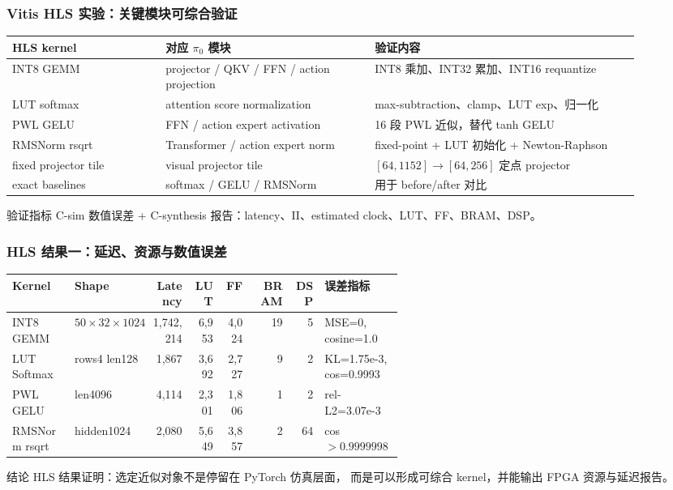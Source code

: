 \documentclass[10pt, aspectratio=169]{beamer}
\begin{document}
\begin{frame}
  \frametitle{Vitis HLS 实验：关键模块可综合验证}
  \small
  \begin{table}
    \scriptsize
    \setlength{\tabcolsep}{2pt}
    \begin{tabular}{@{}p{0.22\linewidth}p{0.30\linewidth}p{0.38\linewidth}@{}}
      \toprule
      HLS kernel & 对应 $\pi_0$ 模块 & 验证内容 \\
      \midrule
      INT8 GEMM & projector / QKV / FFN / action projection & INT8 乘加、INT32 累加、INT16 requantize \\
      LUT softmax & attention score normalization & max-subtraction、clamp、LUT exp、归一化 \\
      PWL GELU & FFN / action expert activation & 16 段 PWL 近似，替代 tanh GELU \\
      RMSNorm rsqrt & Transformer / action expert norm & fixed-point + LUT 初始化 + Newton-Raphson \\
      fixed projector tile & visual projector tile & $[64,1152]\rightarrow[64,256]$ 定点 projector \\
      exact baselines & softmax / GELU / RMSNorm & 用于 before/after 对比 \\
      \bottomrule
    \end{tabular}
  \end{table}

  \begin{exampleblock}{验证指标}
    C-sim 数值误差 + C-synthesis 报告：latency、II、estimated clock、LUT、FF、BRAM、DSP。
  \end{exampleblock}
\end{frame}

\begin{frame}
  \frametitle{HLS 结果一：延迟、资源与数值误差}
  \scriptsize
  \begin{table}
    \setlength{\tabcolsep}{2pt}
    \begin{tabular}{@{}p{0.16\linewidth}p{0.20\linewidth}rrrrrp{0.20\linewidth}@{}}
      \toprule
      Kernel & Shape & Latency & LUT & FF & BRAM & DSP & 误差指标 \\
      \midrule
      INT8 GEMM & $50\times32\times1024$ & 1,742,214 & 6,953 & 4,024 & 19 & 5 & MSE=0, cosine=1.0 \\
      LUT Softmax & rows4 len128 & 1,867 & 3,692 & 2,727 & 9 & 2 & KL=1.75e-3, cos=0.9993 \\
      PWL GELU & len4096 & 4,114 & 2,301 & 1,806 & 1 & 2 & rel-L2=3.07e-3 \\
      RMSNorm rsqrt & hidden1024 & 2,080 & 5,649 & 3,857 & 2 & 64 & cos $>0.9999998$ \\
      \bottomrule
    \end{tabular}
  \end{table}

  \vspace{3pt}
  \begin{alertblock}{结论}
    HLS 结果证明：选定近似对象不是停留在 PyTorch 仿真层面，
    而是可以形成可综合 kernel，并能输出 FPGA 资源与延迟报告。
  \end{alertblock}
\end{frame}
\end{document}
